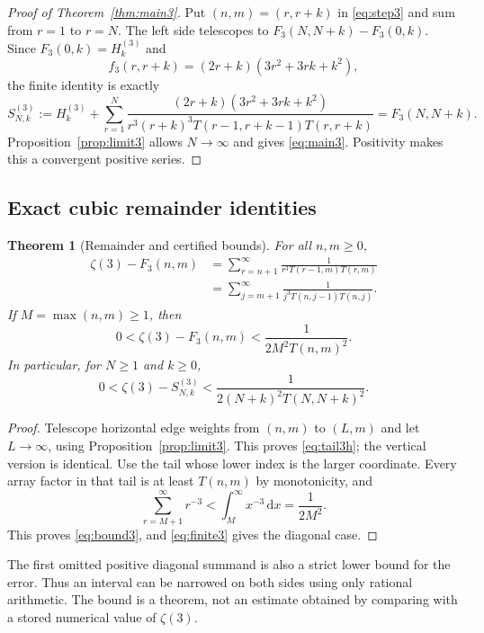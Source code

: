 \documentclass[11pt]{article}
\numberwithin{equation}{section}
\newtheorem{theorem}{Theorem}[section]
\theoremstyle{definition}
\theoremstyle{remark}
\newcommand{\dd}{\,\mathrm d}
\newcommand{\HS}[2]{H_{#1}^{(#2)}}
\newcommand{\Sthree}[2]{S^{(3)}_{#1,#2}}
\begin{document}
\begin{proof}[Proof of Theorem~\ref{thm:main3}]
Put $(n,m)=(r,r+k)$ in \eqref{eq:step3} and sum from $r=1$ to $r=N$.
The left side telescopes to $F_3(N,N+k)-F_3(0,k)$.
Since $F_3(0,k)=\HS{k}{3}$ and
\[
 f_3(r,r+k)=(2r+k)(3r^2+3rk+k^2),
\]
the finite identity is exactly
\begin{equation}\label{eq:finite3}
 \Sthree{N}{k}:=\HS{k}{3}+
 \sum_{r=1}^N\frac{(2r+k)(3r^2+3rk+k^2)}
 {r^3(r+k)^3T(r-1,r+k-1)T(r,r+k)}=F_3(N,N+k).
\end{equation}
Proposition~\ref{prop:limit3} allows $N\to\infty$ and gives
\eqref{eq:main3}. Positivity makes this a convergent positive series.
\end{proof}

\subsection{Exact cubic remainder identities}
\begin{theorem}[Remainder and certified bounds]\label{thm:error3}
For all $n,m\geq0$,
\begin{align}
 \zeta(3)-F_3(n,m)
 &=\sum_{r=n+1}^\infty
   \frac1{r^3T(r-1,m)T(r,m)}\label{eq:tail3h}\\
 &=\sum_{j=m+1}^\infty
   \frac1{j^3T(n,j-1)T(n,j)}.\label{eq:tail3v}
\end{align}
If $M=\max(n,m)\geq1$, then
\begin{equation}\label{eq:bound3}
 0<\zeta(3)-F_3(n,m)<\frac1{2M^2T(n,m)^2}.
\end{equation}
In particular, for $N\geq1$ and $k\geq0$,
\begin{equation}\label{eq:bound3diag}
 0<\zeta(3)-\Sthree{N}{k}
 <\frac1{2(N+k)^2T(N,N+k)^2}.
\end{equation}
\end{theorem}
\begin{proof}
Telescope horizontal edge weights from $(n,m)$ to $(L,m)$ and let
$L\to\infty$, using Proposition~\ref{prop:limit3}. This proves
\eqref{eq:tail3h}; the vertical version is identical.
Use the tail whose lower index is the larger coordinate. Every array
factor in that tail is at least $T(n,m)$ by monotonicity, and
\[
 \sum_{r=M+1}^\infty r^{-3}<\int_M^\infty x^{-3}\dd x=\frac1{2M^2}.
\]
This proves \eqref{eq:bound3}, and \eqref{eq:finite3} gives the diagonal case.
\end{proof}

The first omitted positive diagonal summand is also a strict lower
bound for the error. Thus an interval can be narrowed on both sides
using only rational arithmetic. The bound is a theorem, not an estimate
obtained by comparing with a stored numerical value of $\zeta(3)$.
\end{document}
